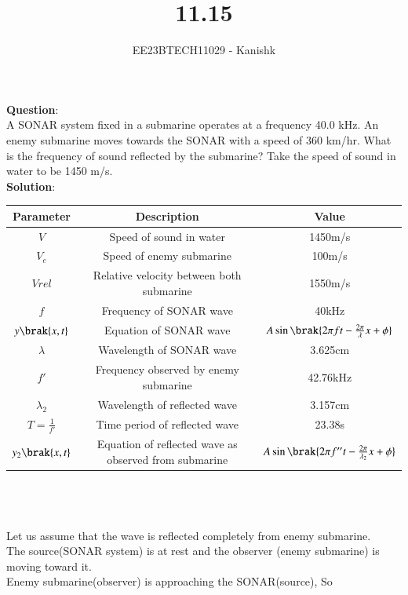\documentclass[journal,12pt,onecolumn]{IEEEtran}
\theoremstyle{remark}
\begin{document}

\vspace{3cm}

\title{11.15}
\author{EE23BTECH11029 - Kanishk}
\maketitle

\bigskip

\renewcommand{\thefigure}{\theenumi}
\renewcommand{\thetable}{\theenumi}
\footnotesize
\textbf{Question}:\\ 

A SONAR system fixed in a submarine operates at a frequency 40.0 kHz. An enemy submarine moves towards the SONAR with a speed of 360 km/hr. What is the frequency of sound reflected by the submarine? Take the speed of sound in water to be 1450 m/s.\\

\textbf{Solution}:\\


\begin{tabular}{|c|c|c|}
   
   \hline
   Parameter & Description & Value\\
   \hline
   $V $& Speed of sound in water & 1450m/s\\
   \hline 
   $V_e$ & Speed of enemy submarine & 100m/s\\
   \hline 
   $Vrel$ & Relative velocity between both submarine & 1550m/s\\
   \hline
   $f $& Frequency of SONAR wave & 40kHz\\ 
   \hline
   $y\brak{x,t}$ & Equation of SONAR wave & $A\sin\brak{2\pi ft-\frac{2\pi}{\lambda}x+\phi}$\\
   \hline
   $\lambda$ & Wavelength of SONAR wave & 3.625cm\\
    \hline
   $ f' $& Frequency observed by enemy submarine & 42.76kHz\\
   \hline
   $\lambda_2$ & Wavelength of reflected wave & 3.157cm\\
   \hline 
   $T=\frac{1}{f'}$ & Time period of reflected wave & 23.38s\\
   \hline
  $ y_2\brak{x,t}$ & Equation of reflected wave as observed from submarine& $A\sin\brak{2\pi f''t-\frac{2\pi}{\lambda_2}x+\phi}$\\
   \hline
   
\end{tabular}   
\\
\\
\\
Let us assume that the wave is reflected completely from enemy submarine.\\
The source(SONAR system) is at rest and the observer (enemy submarine) is moving toward it. \\
Enemy submarine(observer) is approaching the SONAR(source), So 
\end{document}
